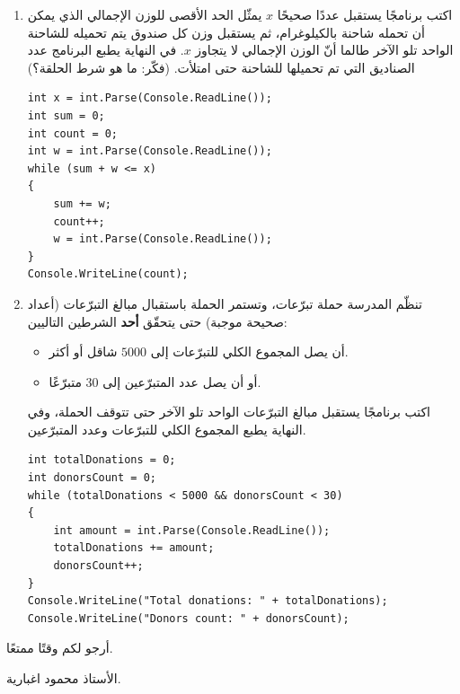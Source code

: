 \documentclass[14pt]{extarticle}
\begin{document}
\begin{enumerate}[resume, itemsep=2em]
\item اكتب برنامجًا يستقبل عددًا صحيحًا $x$ يمثّل الحد الأقصى للوزن الإجمالي الذي يمكن أن تحمله شاحنة بالكيلوغرام، ثم يستقبل وزن كل صندوق يتم تحميله للشاحنة الواحد تلو الآخر طالما أنّ الوزن الإجمالي لا يتجاوز $x$. في النهاية يطبع البرنامج عدد الصناديق التي تم تحميلها للشاحنة حتى امتلأت. (فكّر: ما هو شرط الحلقة؟)
\ifwithsols
\begin{boxSolution}
\begin{english}
\begin{verbatim}
int x = int.Parse(Console.ReadLine());
int sum = 0;
int count = 0;
int w = int.Parse(Console.ReadLine());
while (sum + w <= x)
{
    sum += w;
    count++;
    w = int.Parse(Console.ReadLine());
}
Console.WriteLine(count);
\end{verbatim}
\end{english}
\end{boxSolution}
\fi
\filbreak

\item تنظّم المدرسة حملة تبرّعات، وتستمر الحملة باستقبال مبالغ التبرّعات (أعداد صحيحة موجبة) حتى يتحقّق \textbf{أحد} الشرطين التاليين:
\begin{itemize}[nosep]
    \item أن يصل المجموع الكلي للتبرّعات إلى $5000$ شاقل أو أكثر.
    \item أو أن يصل عدد المتبرّعين إلى $30$ متبرّعًا.
\end{itemize}
اكتب برنامجًا يستقبل مبالغ التبرّعات الواحد تلو الآخر حتى تتوقف الحملة، وفي النهاية يطبع المجموع الكلي للتبرّعات وعدد المتبرّعين.
\ifwithsols
\begin{boxSolution}
\begin{english}
\begin{verbatim}
int totalDonations = 0;
int donorsCount = 0;
while (totalDonations < 5000 && donorsCount < 30)
{
    int amount = int.Parse(Console.ReadLine());
    totalDonations += amount;
    donorsCount++;
}
Console.WriteLine("Total donations: " + totalDonations);
Console.WriteLine("Donors count: " + donorsCount);
\end{verbatim}
\end{english}
\end{boxSolution}
\fi
\filbreak

\end{enumerate}

\vspace{1cm}
\begin{flushleft}
أرجو لكم وقتًا ممتعًا.

الأستاذ محمود اغبارية.
\end{flushleft}
\end{document}
